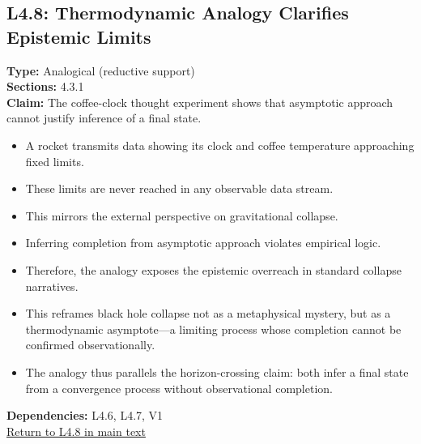 \documentclass[12pt]{book}
\newcommand{\returnlink}[1]{\hyperref[logic:#1]{Return to #1 in main text}\xspace}
\begin{document}
\subsection*{L4.8: Thermodynamic Analogy Clarifies Epistemic Limits}\label{appendix:L4.8}
\textbf{Type:} Analogical (reductive support) \\
\textbf{Sections:} 4.3.1 \\
\textbf{Claim:} The coffee-clock thought experiment shows that asymptotic approach cannot justify inference of a final state.
\begin{itemize}
  \item A rocket transmits data showing its clock and coffee temperature approaching fixed limits.
  \item These limits are never reached in any observable data stream.
  \item This mirrors the external perspective on gravitational collapse.
  \item Inferring completion from asymptotic approach violates empirical logic. 
  \item Therefore, the analogy exposes the epistemic overreach in standard collapse narratives.
  \item This reframes black hole collapse not as a metaphysical mystery, but as a thermodynamic asymptote---a limiting process whose completion cannot be confirmed observationally.
  \item The analogy thus parallels the horizon-crossing claim: both infer a final state from a convergence process without observational completion.
\end{itemize}
\textbf{Dependencies:} L4.6, L4.7, V1 \\
\returnlink{L4.8}
\end{document}
